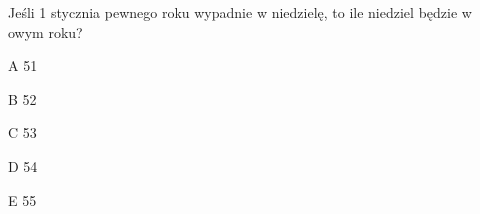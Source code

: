 \begin{tresc}
Jeśli 1 stycznia pewnego roku wypadnie w niedzielę, to ile niedziel będzie w owym roku?
\end{tresc}
\begin{wariant}{A} 51 \end{wariant}
\begin{wariant}{B} 52 \end{wariant}
\begin{wariant}{C} 53 \end{wariant}
\begin{wariant}{D} 54 \end{wariant}
\begin{wariant}{E} 55 \end{wariant}
